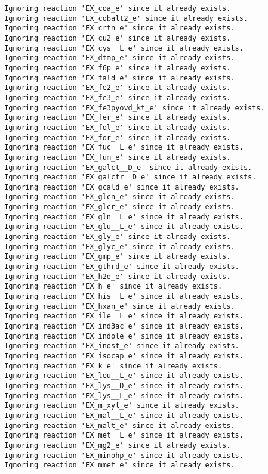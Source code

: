 \documentclass[
  letterpaper,
  DIV=11,
  numbers=noendperiod]{scrartcl}
\begin{document}
\begin{verbatim}
Ignoring reaction 'EX_coa_e' since it already exists.
Ignoring reaction 'EX_cobalt2_e' since it already exists.
Ignoring reaction 'EX_crtn_e' since it already exists.
Ignoring reaction 'EX_cu2_e' since it already exists.
Ignoring reaction 'EX_cys__L_e' since it already exists.
Ignoring reaction 'EX_dtmp_e' since it already exists.
Ignoring reaction 'EX_f6p_e' since it already exists.
Ignoring reaction 'EX_fald_e' since it already exists.
Ignoring reaction 'EX_fe2_e' since it already exists.
Ignoring reaction 'EX_fe3_e' since it already exists.
Ignoring reaction 'EX_fe3pyovd_kt_e' since it already exists.
Ignoring reaction 'EX_fer_e' since it already exists.
Ignoring reaction 'EX_fol_e' since it already exists.
Ignoring reaction 'EX_for_e' since it already exists.
Ignoring reaction 'EX_fuc__L_e' since it already exists.
Ignoring reaction 'EX_fum_e' since it already exists.
Ignoring reaction 'EX_galct__D_e' since it already exists.
Ignoring reaction 'EX_galctr__D_e' since it already exists.
Ignoring reaction 'EX_gcald_e' since it already exists.
Ignoring reaction 'EX_glcn_e' since it already exists.
Ignoring reaction 'EX_glcr_e' since it already exists.
Ignoring reaction 'EX_gln__L_e' since it already exists.
Ignoring reaction 'EX_glu__L_e' since it already exists.
Ignoring reaction 'EX_gly_e' since it already exists.
Ignoring reaction 'EX_glyc_e' since it already exists.
Ignoring reaction 'EX_gmp_e' since it already exists.
Ignoring reaction 'EX_gthrd_e' since it already exists.
Ignoring reaction 'EX_h2o_e' since it already exists.
Ignoring reaction 'EX_h_e' since it already exists.
Ignoring reaction 'EX_his__L_e' since it already exists.
Ignoring reaction 'EX_hxan_e' since it already exists.
Ignoring reaction 'EX_ile__L_e' since it already exists.
Ignoring reaction 'EX_ind3ac_e' since it already exists.
Ignoring reaction 'EX_indole_e' since it already exists.
Ignoring reaction 'EX_inost_e' since it already exists.
Ignoring reaction 'EX_isocap_e' since it already exists.
Ignoring reaction 'EX_k_e' since it already exists.
Ignoring reaction 'EX_leu__L_e' since it already exists.
Ignoring reaction 'EX_lys__D_e' since it already exists.
Ignoring reaction 'EX_lys__L_e' since it already exists.
Ignoring reaction 'EX_m_xyl_e' since it already exists.
Ignoring reaction 'EX_mal__L_e' since it already exists.
Ignoring reaction 'EX_malt_e' since it already exists.
Ignoring reaction 'EX_met__L_e' since it already exists.
Ignoring reaction 'EX_mg2_e' since it already exists.
Ignoring reaction 'EX_minohp_e' since it already exists.
Ignoring reaction 'EX_mmet_e' since it already exists.

\end{verbatim}
\end{document}
